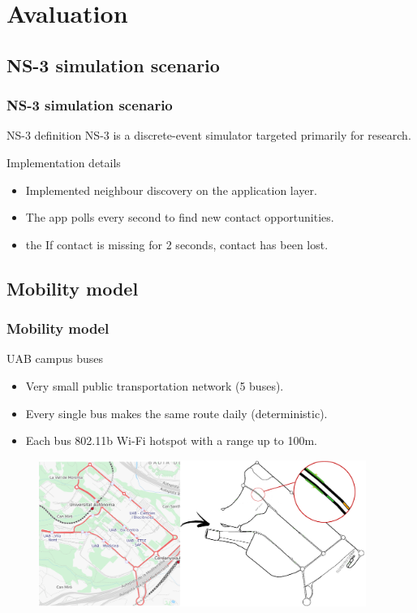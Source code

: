 \documentclass[compress,red]{beamer}
\begin{document}
\section{Avaluation}
\subsection{NS-3 simulation scenario}
\begin{frame}
\frametitle{NS-3 simulation scenario}
\begin{block}{NS-3 definition}
NS-3 is a discrete-event simulator targeted primarily for research.
\end{block}
\bigskip
\begin{block}{Implementation details}
\begin{itemize}
\item Implemented neighbour discovery on the application layer.
\item The app polls every second to find new contact opportunities.
\item the If contact is missing for 2 seconds, contact has been lost.
\end{itemize}
\end{block}
\bigskip
\end{frame}

\subsection{Mobility model}
\begin{frame}
\frametitle{Mobility model}
\begin{block}{UAB campus buses}
\begin{itemize}
\item Very small public transportation network (5 buses).
\item Every single bus makes the same route daily (deterministic).
\item Each bus 802.11b Wi-Fi hotspot with a range up to 100m.
\end{itemize}
\end{block}
\begin{figure}
\includegraphics[width=0.95\textwidth]{../paper/imgs/presentation/process}
\end{figure}
\end{frame}
\end{document}
